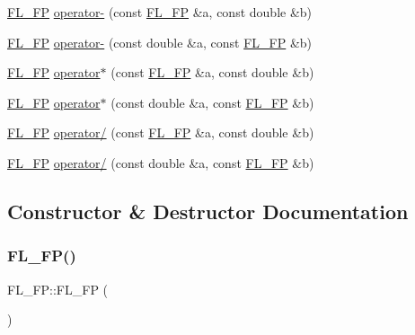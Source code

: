 \begin{DoxyCompactItemize}
\item 
\hyperlink{class_f_l___f_p}{F\+L\+\_\+\+FP} \hyperlink{class_f_l___f_p_a4355725c40ad917191e6384f58177915}{operator-\/} (const \hyperlink{class_f_l___f_p}{F\+L\+\_\+\+FP} \&a, const double \&b)
\item 
\hyperlink{class_f_l___f_p}{F\+L\+\_\+\+FP} \hyperlink{class_f_l___f_p_afede6b6bcb4b0e35903a5e47cb0096e1}{operator-\/} (const double \&a, const \hyperlink{class_f_l___f_p}{F\+L\+\_\+\+FP} \&b)
\item 
\hyperlink{class_f_l___f_p}{F\+L\+\_\+\+FP} \hyperlink{class_f_l___f_p_a4d88f005bc60cbdceb070335a94a068a}{operator$\ast$} (const \hyperlink{class_f_l___f_p}{F\+L\+\_\+\+FP} \&a, const double \&b)
\item 
\hyperlink{class_f_l___f_p}{F\+L\+\_\+\+FP} \hyperlink{class_f_l___f_p_a248f294ecf7ddc53650ef72b848e6bb5}{operator$\ast$} (const double \&a, const \hyperlink{class_f_l___f_p}{F\+L\+\_\+\+FP} \&b)
\item 
\hyperlink{class_f_l___f_p}{F\+L\+\_\+\+FP} \hyperlink{class_f_l___f_p_a10e4527f31f6a72dfc92215a83bbf439}{operator/} (const \hyperlink{class_f_l___f_p}{F\+L\+\_\+\+FP} \&a, const double \&b)
\item 
\hyperlink{class_f_l___f_p}{F\+L\+\_\+\+FP} \hyperlink{class_f_l___f_p_a748c3789021613fe839afe4289689f88}{operator/} (const double \&a, const \hyperlink{class_f_l___f_p}{F\+L\+\_\+\+FP} \&b)
\end{DoxyCompactItemize}


\subsection{Constructor \& Destructor Documentation}
\mbox{\label{class_f_l___f_p_a2db44ca3f010e72af1a0ba97f443fe93}} 
\subsubsection{\texorpdfstring{F\+L\+\_\+\+F\+P()}{FL\_FP()}\hspace{0.1cm}{\footnotesize\ttfamily [1/4]}}
{\footnotesize\ttfamily F\+L\+\_\+\+F\+P\+::\+F\+L\+\_\+\+FP (\begin{DoxyParamCaption}{ }\end{DoxyParamCaption})\hspace{0.3cm}{\ttfamily [inline]}}

